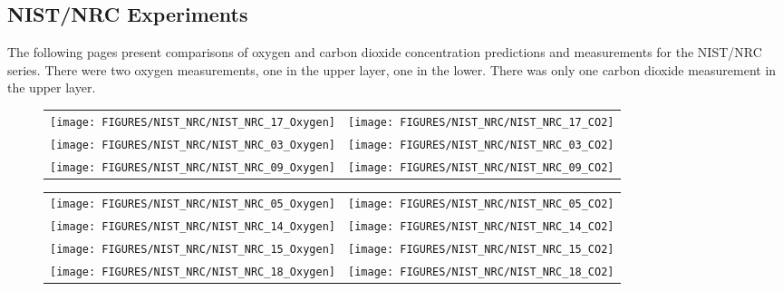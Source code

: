 \clearpage

\subsection{NIST/NRC Experiments}

The following pages present comparisons of oxygen and carbon dioxide concentration predictions and measurements for the
NIST/NRC series. There were two oxygen measurements, one in the upper layer, one in the lower.  There was only one carbon
dioxide measurement in the upper layer.

\begin{figure}[h!]
\begin{tabular*}{\textwidth}{l@{\extracolsep{\fill}}r}
\texttt{[image: FIGURES/NIST\_NRC/NIST\_NRC\_17\_Oxygen]} &
\texttt{[image: FIGURES/NIST\_NRC/NIST\_NRC\_17\_CO2]} \\
\texttt{[image: FIGURES/NIST\_NRC/NIST\_NRC\_03\_Oxygen]} &
\texttt{[image: FIGURES/NIST\_NRC/NIST\_NRC\_03\_CO2]} \\
\texttt{[image: FIGURES/NIST\_NRC/NIST\_NRC\_09\_Oxygen]} &
\texttt{[image: FIGURES/NIST\_NRC/NIST\_NRC\_09\_CO2]}
\end{tabular*}
\label{NIST_NRC_Gas_Open_1}
\end{figure}

\begin{figure}[p]
\begin{tabular*}{\textwidth}{l@{\extracolsep{\fill}}r}
\texttt{[image: FIGURES/NIST\_NRC/NIST\_NRC\_05\_Oxygen]} &
\texttt{[image: FIGURES/NIST\_NRC/NIST\_NRC\_05\_CO2]} \\
\texttt{[image: FIGURES/NIST\_NRC/NIST\_NRC\_14\_Oxygen]} &
\texttt{[image: FIGURES/NIST\_NRC/NIST\_NRC\_14\_CO2]} \\
\texttt{[image: FIGURES/NIST\_NRC/NIST\_NRC\_15\_Oxygen]} &
\texttt{[image: FIGURES/NIST\_NRC/NIST\_NRC\_15\_CO2]} \\
\texttt{[image: FIGURES/NIST\_NRC/NIST\_NRC\_18\_Oxygen]} &
\texttt{[image: FIGURES/NIST\_NRC/NIST\_NRC\_18\_CO2]}
\end{tabular*}
\label{NIST_NRC_Gas_Open_2}
\end{figure}

